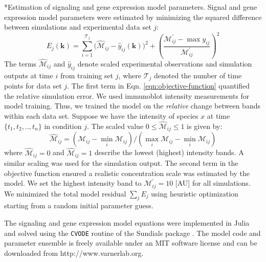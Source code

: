 \documentclass[12pt]{article}
\makeatletter
\renewcommand\subsubsection{\@startsection
	{subsubsection}{2}{0mm}
	{-0.05in}
	{-0.5\baselineskip}
	{\normalfont\normalsize\itshape}}
\makeatother
\begin{document}
\noindent\subsubsection*{Estimation of signaling and gene expression model parameters.}
Signal and gene expression model parameters were estimated by minimizing the squared difference between simulations and experimental data set $j$:
\begin{equation}\label{eqn:objective-function}
	E_{j}(\mathbf{k}) = \sum_{i=1}^{\mathcal{T}_{j}}\biggl(\hat{\mathcal{M}}_{ij}-\hat{y}_{ij}(\mathbf{k})\biggr)^2 + \left(\frac{{\mathcal{M}^{\prime}_{ij}}-\max{y_{ij}}}{{\mathcal{M}^{\prime}_{ij}}}\right)^{2}
\end{equation}
The terms $\hat{\mathcal{M}}_{ij}$ and $\hat{y}_{ij}$ denote scaled experimental observations and simulation outputs at time $i$ from training set $j$,
where $\mathcal{T}_{j}$ denoted the number of time points for data set $j$.
The first term in Eqn. \eqref{eqn:objective-function} quantified the relative simulation error.
We used immunoblot intensity measurements for model training.
Thus, we trained the model on the \emph{relative} change between bands within each data set.
Suppose we have the intensity of species $x$ at time $\{t_{1},t_{2},..,t_{n}\}$ in condition $j$.
The scaled value $0\leq\hat{\mathcal{M}}_{ij}\leq{1}$ is given by:
\begin{equation}\label{norm_exp_data}
\hat{\mathcal{M}}_{ij} = \left({\mathcal{M}_{ij} - \min_{i}\mathcal{M}_{ij}}\right)/\left({\max_{i}{\mathcal{M}_{ij}}-\min_{i}{\mathcal{M}_{ij}}}\right)
\end{equation}
where $\hat{\mathcal{M}}_{ij}=0$ and $\hat{\mathcal{M}}_{ij}=1$  describe the lowest (highest) intensity bands.
A similar scaling was used for the simulation output. The second term in the objective function ensured a realistic concentration scale was estimated by the model.
We set the highest intensity band to $\mathcal{M}^{\prime}_{ij} = 10$ [AU] for all simulations.
We minimized the total model residual $\sum_{j}E_{j}$ using heuristic optimization starting from a random initial parameter guess.

The signaling and gene expression model equations were implemented in Julia and solved using the \texttt{CVODE} routine of the Sundials package \cite{Julia,Hindmarsh2005}.
The model code and parameter ensemble is freely available under an MIT software license and can be downloaded from http://www.varnerlab.org.


\end{document}
